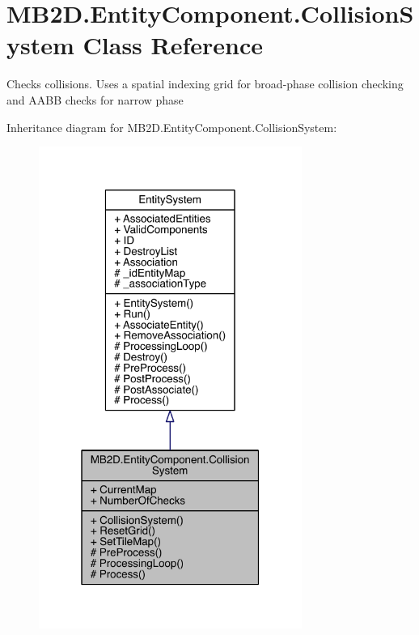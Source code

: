 \hypertarget{class_m_b2_d_1_1_entity_component_1_1_collision_system}{}\section{M\+B2\+D.\+Entity\+Component.\+Collision\+System Class Reference}
\label{class_m_b2_d_1_1_entity_component_1_1_collision_system}


Checks collisions. Uses a spatial indexing grid for broad-\/phase collision checking and A\+A\+BB checks for narrow phase  




Inheritance diagram for M\+B2\+D.\+Entity\+Component.\+Collision\+System\+:
\nopagebreak
\begin{figure}[H]
\begin{center}
\leavevmode
\includegraphics[width=244pt]{class_m_b2_d_1_1_entity_component_1_1_collision_system__inherit__graph}
\end{center}
\end{figure}


